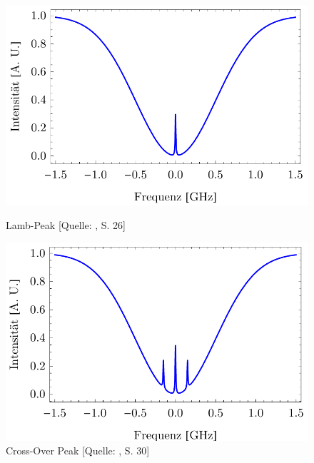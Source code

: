 \begin{figure}[!h]
    \begin{minipage}{7cm}
        \centering
        \includegraphics[scale = 0.4]{figures/images/lamb-peak.png}
        \caption{Lamb-Peak [Quelle: \cite{H2}, S. 26]}
        \label{fig:lamb-peak}
    \end{minipage}
    \hfill
    \begin{minipage}{8cm}
        \centering
        \includegraphics[scale = 0.4]{figures/images/cross-over-peak.png}
        \caption{Cross-Over Peak [Quelle: \cite{H2}, S. 30]}
        \label{fig:crossover-peak}
    \end{minipage}
\end{figure}


\cleardoublepage{}